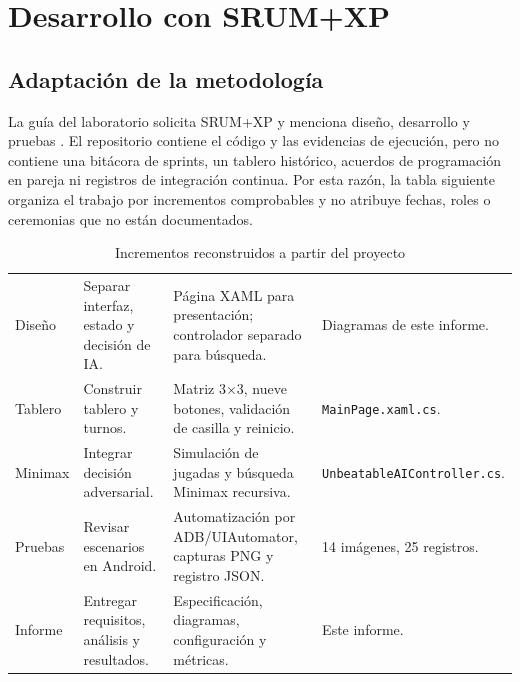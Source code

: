 \chapter{Desarrollo con SRUM+XP}
\section{Adaptación de la metodología}
La guía del laboratorio solicita SRUM+XP y menciona diseño, desarrollo y pruebas \cite{guia}. El repositorio contiene el código y las evidencias de ejecución, pero no contiene una bitácora de sprints, un tablero histórico, acuerdos de programación en pareja ni registros de integración continua. Por esta razón, la tabla siguiente organiza el trabajo por incrementos comprobables y no atribuye fechas, roles o ceremonias que no están documentados.

\begin{table}[H]
\centering
\small
\caption{Incrementos reconstruidos a partir del proyecto}\label{tab:increments}
\begin{tabular}{P{2.0cm}P{3.2cm}P{5.8cm}P{2.8cm}}
\toprule
{} &  &  & \\
\midrule
Diseño & Separar interfaz, estado y decisión de IA. & Página XAML para presentación; controlador separado para búsqueda. & Diagramas de este informe.\\
Tablero & Construir tablero y turnos. & Matriz 3$\times$3, nueve botones, validación de casilla y reinicio. & \texttt{MainPage.}\allowbreak\texttt{xaml.cs}.\\
Minimax & Integrar decisión adversarial. & Simulación de jugadas y búsqueda Minimax recursiva. & \texttt{UnbeatableAI}\allowbreak\texttt{Controller.cs}.\\
Pruebas & Revisar escenarios en Android. & Automatización por ADB/UIAutomator, capturas PNG y registro JSON. & 14 imágenes, 25 registros.\\
Informe & Entregar requisitos, análisis y resultados. & Especificación, diagramas, configuración y métricas. & Este informe.\\
\bottomrule
\end{tabular}
\end{table}

